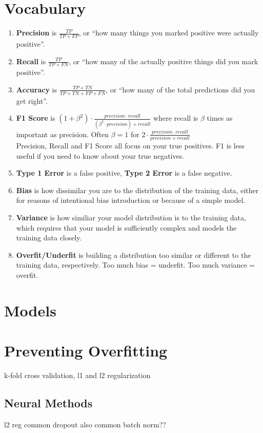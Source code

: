 \documentclass[11pt]{article}
\begin{document}
\section{Vocabulary}
\begin{enumerate}
\item \textbf{Precision} is $\frac{TP}{TP + FP}$, or ``how many things you marked positive were actually positive''. 
\item \textbf{Recall} is $\frac{TP}{TP + FN}$, or ``how many of the actually positive things did you mark positive''.
\item  \textbf{Accuracy} is $\frac{TP + TN}{TP + TN + FP + FN}$, or ``how many of the total predictions did you get right''.
\item \textbf{F1 Score} is $(1 + \beta^2) \cdot \frac{precision \cdot recall}{(\beta^2 \cdot precision) + recall}$ where recall is $\beta$ times as important as precision. Often $\beta = 1$ for $2 \cdot \frac{precision \cdot recall}{precision + recall}$\\

Precision, Recall and F1 Score all focus on your true positives. F1 is less useful if you need to know about your true negatives.
\item \textbf{Type 1 Error} is a false positive, \textbf{Type 2 Error} is a false negative.
\item \textbf{Bias} is how dissimilar you are to the distribution of the training data, either for reasons of intentional bias introduction or because of a simple model.
\item \textbf{Variance} is how similiar your model distribution is to the training data, which requires that your model is sufficiently complex and models the training data closely.
\item \textbf{Overfit/Underfit} is building a distribution too similar or different to the training data, respectively. Too much bias = underfit. Too much variance = overfit. 
\end{enumerate}

\section{Models}

\section{Preventing Overfitting}
k-fold cross validation, l1 and l2 regularization
\subsection{Neural Methods}
l2 reg common
dropout also common
batch norm??
\end{document}

